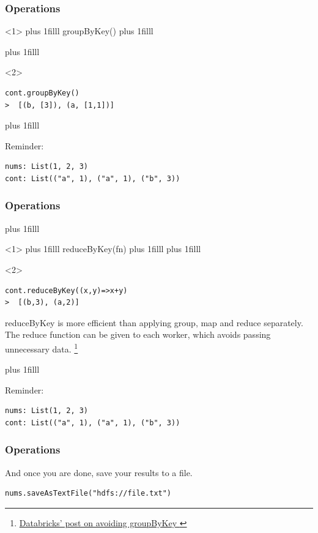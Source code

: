 \documentclass{beamer}
\newcommand{\btVFill}{\vskip0pt plus 1filll}
\begin{document}

\begin{frame}[fragile]
\frametitle{Operations}
\begin{onlyenv}<1>
  \btVFill
{\huge\ttfamily groupByKey()}
  \btVFill
\end{onlyenv}

\btVFill
\begin{onlyenv}<2>
  \begin{lstlisting}[title={Group elements of a list by the first item in the tuple}, numbers=none,basicstyle=\Large\ttfamily,linebackgroundcolor={\btLstHL<2>{1}}]
cont.groupByKey()
>  [(b, [3]), (a, [1,1])]
    \end{lstlisting}
\end{onlyenv}

\btVFill

Reminder:
\begin{lstlisting}[numbers=none,linebackgroundcolor={\color{lightyellow}}]
nums: List(1, 2, 3)
cont: List(("a", 1), ("a", 1), ("b", 3))
\end{lstlisting}

\end{frame}
\begin{frame}[fragile]
\frametitle{Operations}
\btVFill
\begin{onlyenv}<1>
  \btVFill
{\huge \ttfamily reduceByKey(fn)}
  \btVFill
\btVFill
\end{onlyenv}
\begin{onlyenv}<2>
  \begin{lstlisting}[title={Group by key and reduce each value},basicstyle=\huge\ttfamily,basicstyle=\Large\ttfamily,linebackgroundcolor={\btLstHL<2>{1}}]
cont.reduceByKey((x,y)=>x+y) 
>  [(b,3), (a,2)]
\end{lstlisting}
  
reduceByKey is more efficient than applying group, map and reduce separately. The reduce function can be given to each worker, which avoids passing unnecessary data.
\footnote{\href{https://databricks.gitbooks.io/databricks-spark-knowledge-base/content/best_practices/prefer_reducebykey_over_groupbykey.html}{Databricks' post on avoiding groupByKey }}
\end{onlyenv}

\btVFill

Reminder:
\begin{lstlisting}[numbers=none,linebackgroundcolor={\color{lightyellow}}]
nums: List(1, 2, 3)
cont: List(("a", 1), ("a", 1), ("b", 3))
\end{lstlisting}

\end{frame}
\begin{frame}[fragile]
\frametitle{Operations}

And once you are done, save your results to a file.

  \begin{lstlisting}[basicstyle=\Large\ttfamily]
nums.saveAsTextFile("hdfs://file.txt")
  \end{lstlisting}

\end{frame}
\end{document}
